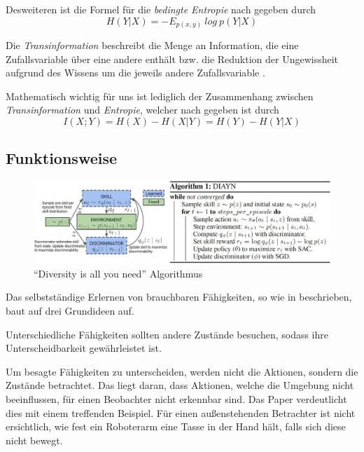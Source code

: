 Desweiteren ist die Formel für die \textit{bedingte Entropie} nach \cite{elements_cover} gegeben durch
\begin{equation}
    H(Y|X) = - E_{p(x,y)}\ log\ p(Y|X) \label{eq:condit_entropy}
\end{equation}

\smallspace

Die \textit{Transinformation} beschreibt die Menge an Information, die eine Zufallsvariable über eine andere enthält bzw. die Reduktion der Ungewissheit aufgrund des Wissens um die jeweils andere Zufallsvariable \cite{elements_cover}.

Mathematisch wichtig für uns ist lediglich der Zusammenhang zwischen \textit{Transinformation} und \textit{Entropie}, welcher nach \cite{elements_cover} gegeben ist durch
\begin{equation}
    I(X;Y) = H(X) - H(X|Y) = H(Y) - H(Y|X) \label{eq:trans_ent}
\end{equation}

\subsection{Funktionsweise}
\label{sec:howitworks}
\begin{figure}
\includegraphics[width=\textwidth, keepaspectratio=true]{images/algorithm_diayn.JPG}
\caption{``Diversity is all you need'' Algorithmus} \label{img:diayn}
\end{figure}
Das selbstständige Erlernen von brauchbaren Fähigkeiten, so wie in \cite{diversity_eysenbach} beschrieben, baut auf drei Grundideen auf.

\smallspace

Unterschiedliche Fähigkeiten sollten andere Zustände besuchen, sodass ihre Unterscheidbarkeit gewährleistet ist.

Um besagte Fähigkeiten zu unterscheiden, werden nicht die Aktionen, sondern die Zustände betrachtet. Das liegt daran, dass Aktionen, welche die Umgebung nicht beeinflussen, für einen Beobachter nicht erkennbar sind. Das Paper verdeutlicht dies mit einem treffenden Beispiel. Für einen außenstehenden Betrachter ist nicht ersichtlich, wie fest ein Roboterarm eine Tasse in der Hand hält, falls sich diese nicht bewegt.

